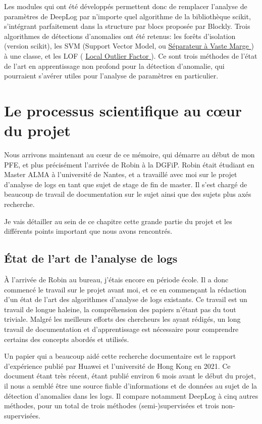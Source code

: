 \documentclass[openany, 11pt]{memoir}
\newcommand\link[2]{
	\href{#1}{#2 {\small\faExternalLink}}
}
\begin{document}
Les modules qui ont été développés permettent donc de remplacer l'analyse de paramètres de DeepLog par n'importe quel algorithme de la bibliothèque scikit, s'intégrant parfaitement dans la structure par blocs proposée par Blockly. Trois algorithmes de détections d'anomalies ont été retenus: les forêts d'isolation (version scikit), les SVM (Support Vector Model, ou \link{https://fr.wikipedia.org/wiki/Machine_à_vecteurs_de_support}{Séparateur à Vaste Marge}) à une classe, et les LOF (\link{https://en.wikipedia.org/wiki/Local_outlier_factor}{Local Outlier Factor}). Ce sont trois méthodes de l'état de l'art en apprentissage non profond pour la détection d'anomalie, qui pourraient s'avérer utiles pour l'analyse de paramètres en particulier.

\newpage
\chapter{Le processus scientifique au cœur du projet}

Nous arrivons maintenant au cœur de ce mémoire, qui démarre au début de mon PFE, et plus précisément l'arrivée de Robin à la \gls{DGFiP}. Robin était étudiant en Master ALMA à l'université de Nantes, et a travaillé avec moi sur le projet d'analyse de \glspl{log} en tant que sujet de stage de fin de master. Il s'est chargé de beaucoup de travail de documentation sur le sujet ainsi que des sujets plus axés recherche.

Je vais détailler au sein de ce chapitre cette grande partie du projet et les différents points important que nous avons rencontrés.

\section{État de l'art de l'analyse de logs}

À l'arrivée de Robin au bureau, j'étais encore en période école. Il a donc commencé le travail sur le projet avant moi, et ce en commençant la rédaction d'un état de l'art des algorithmes d'analyse de \glspl{log} existants. Ce travail est un travail de longue haleine, la compréhension des papiers n'étant pas du tout triviale. Malgré les meilleurs efforts des chercheurs les ayant rédigés, un long travail de documentation et d'apprentissage est nécessaire pour comprendre certains des concepts abordés et utilisés.

Un papier qui a beaucoup aidé cette recherche documentaire est le rapport d'expérience \cite{experiencereport} publié par Huawei et l'université de Hong Kong en 2021. Ce document étant très récent, étant publié environ 6 mois avant le début du projet, il nous a semblé être une source fiable d'informations et de données au sujet de la détection d'anomalies dans les logs. Il compare notamment DeepLog à cinq autres méthodes, pour un total de trois méthodes (semi-)supervisées et trois non-supervisées.
\end{document}
